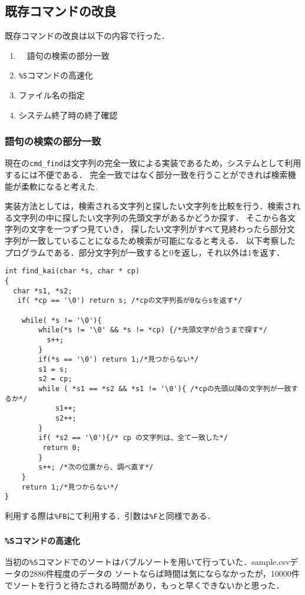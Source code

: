 \documentclass[a4j,11pt]{jarticle}
\begin{document}
\subsection{既存コマンドの改良}\label{sec:kison}
既存コマンドの改良は以下の内容で行った．
\begin{enumerate}
\setlength{\parskip}{2pt} \setlength{\itemsep}{2pt}
    \item　語句の検索の部分一致
    \item \verb|%S|コマンドの高速化
　　 \item ファイル名の指定
    \item システム終了時の終了確認
\end{enumerate}
\subsubsection{語句の検索の部分一致}
現在の\verb|cmd_find|は文字列の完全一致による実装であるため，システムとして利用するには不便である．
完全一致ではなく部分一致を行うことができれば検索機能が柔軟になると考えた.

実装方法としては，検索される文字列と探したい文字列を比較を行う．検索される文字列の中に探したい文字列の先頭文字があるかどうか探す．
そこから各文字列の文字を一つずつ見ていき，
探したい文字列がすべて見終わったら部分文字列が一致していることになるため検索が可能になると考える．
以下考察したプログラムである．部分文字列が一致すると$0$を返し，それ以外は$1$を返す．
\begin{verbatim}
int find_kai(char *s, char * cp)
{
  char *s1, *s2;
   if( *cp == '\0') return s; /*cpの文字列長が0ならsを返す*/ 

    while( *s != '\0'){
        while(*s != '\0' && *s != *cp) {/*先頭文字が合うまで探す*/
          s++;
        }
        if(*s == '\0') return 1;/*見つからない*/
        s1 = s;
        s2 = cp;
        while ( *s1 == *s2 && *s1 != '\0'){ /*cpの先頭以降の文字列が一致するか*/
            s1++;
            s2++;
        }
        if( *s2 == '\0'){/* cp の文字列は、全て一致した*/
         return 0;
        }
        s++; /*次の位置から、調べ直す*/
    }
    return 1;/*見つからない*/
}
\end{verbatim}
利用する際は\verb|%FB|にて利用する．引数は\verb|%F|と同様である．
\subsubsection{\texttt{\%Sコマンドの高速化}}
当初の\verb|%S|コマンドでのソートはバブルソートを用いて行っていた．sample.csvデータの2886件程度のデータの
ソートならば時間は気にならなかったが，10000件でソートを行うと待たされる時間があり，もっと早くできないかと思った．
\end{document}

